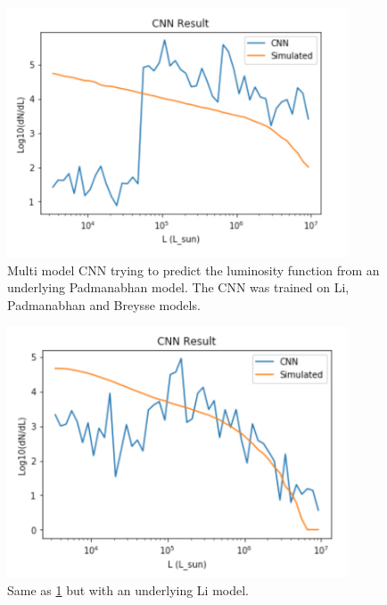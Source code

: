 \documentclass{article}
\begin{document}
		\begin{figure}[H]
			\centering
			\includegraphics[width=0.9\textwidth]{multi_model_Padmanabhan.pdf}
			\caption{Multi model CNN trying to predict the luminosity function from an underlying Padmanabhan model.  The CNN was trained on Li, Padmanabhan and Breysse models.}
			\label{fig:multi_model_Padmanabhan}
		\end{figure}

		\begin{figure}[H]
			\centering
			\includegraphics[width=0.9\textwidth]{multi_model_Li.pdf}
			\caption{Same as \cref{fig:multi_model_Padmanabhan} but with an underlying Li model.}
			\label{fig:multi_model_Li}
		\end{figure}
\end{document}
